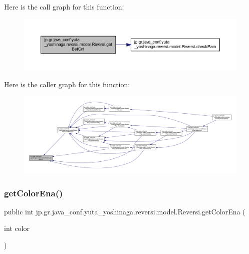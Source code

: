 Here is the call graph for this function\+:
\nopagebreak
\begin{figure}[H]
\begin{center}
\leavevmode
\includegraphics[width=350pt]{classjp_1_1gr_1_1java__conf_1_1yuta__yoshinaga_1_1reversi_1_1model_1_1_reversi_a9f826e110ec3298a6bc5d6987a94519c_cgraph}
\end{center}
\end{figure}
Here is the caller graph for this function\+:
\nopagebreak
\begin{figure}[H]
\begin{center}
\leavevmode
\includegraphics[width=350pt]{classjp_1_1gr_1_1java__conf_1_1yuta__yoshinaga_1_1reversi_1_1model_1_1_reversi_a9f826e110ec3298a6bc5d6987a94519c_icgraph}
\end{center}
\end{figure}
\mbox{\label{classjp_1_1gr_1_1java__conf_1_1yuta__yoshinaga_1_1reversi_1_1model_1_1_reversi_ac6fafa41eeff56abfc67b2b5876b50f9}} 
\subsubsection{\texorpdfstring{get\+Color\+Ena()}{getColorEna()}}
{\footnotesize\ttfamily public int jp.\+gr.\+java\+\_\+conf.\+yuta\+\_\+yoshinaga.\+reversi.\+model.\+Reversi.\+get\+Color\+Ena (\begin{DoxyParamCaption}\item[{int}]{color }\end{DoxyParamCaption})}



